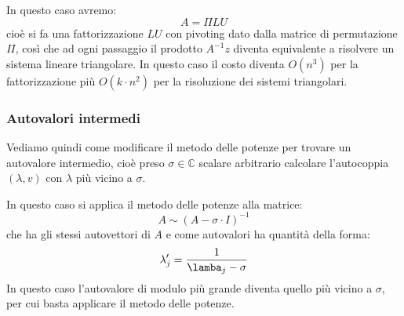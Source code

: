 \documentclass[a4paper,11pt]{article}
\begin{document}
In questo caso avremo:
$$
A = \Pi LU
$$
cioè si fa una fattorizzazione $LU$ con pivoting dato dalla matrice di permutazione $\Pi$, così che ad ogni passaggio il prodotto $A^{-1} z$ diventa equivalente a risolvere un sistema lineare triangolare.
In questo caso il costo diventa $O(n^3)$ per la fattorizzazione più $O(k \cdot n^2)$ per la risoluzione dei sistemi triangolari.

\subsubsection{Autovalori intermedi}
Vediamo quindi come modificare il metodo delle potenze per trovare un autovalore intermedio, cioè preso $\sigma \in \mathbb{C}$ scalare arbitrario calcolare l'autocoppia $(\lambda, v)$ con $\lambda$ più vicino a $\sigma$.

In questo caso si applica il metodo delle potenze alla matrice:
$$
A \sim (A - \sigma \cdot I)^{-1}
$$
che ha gli stessi autovettori di $A$ e come autovalori ha quantità della forma:
$$
\lambda_j' = \frac{1}{\lamba_j - \sigma}
$$
In questo caso l'autovalore di modulo più grande diventa quello più vicino a $\sigma$, per cui basta applicare il metodo delle potenze.
\end{document}
